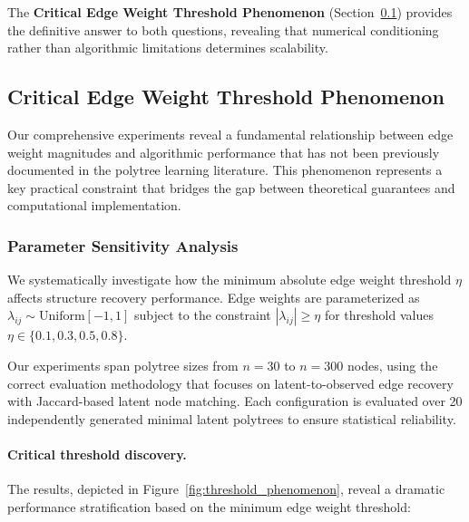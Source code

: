 \documentclass[11pt,a4paper]{article}
\numberwithin{equation}{section}
\begin{document}
The \textbf{Critical Edge Weight Threshold Phenomenon} (Section~\ref{subsec:threshold_phenomenon}) provides the definitive answer to both questions, revealing that numerical conditioning rather than algorithmic limitations determines scalability.


\subsection{Critical Edge Weight Threshold Phenomenon}
\label{subsec:threshold_phenomenon}

Our comprehensive experiments reveal a fundamental relationship between edge weight magnitudes and algorithmic performance that has not been previously documented in the polytree learning literature. This phenomenon represents a key practical constraint that bridges the gap between theoretical guarantees and computational implementation.

\subsubsection{Parameter Sensitivity Analysis}

We systematically investigate how the minimum absolute edge weight threshold $\eta$ affects structure recovery performance. Edge weights are parameterized as $\lambda_{ij} \sim \text{Uniform}[-1,1]$ subject to the constraint $|\lambda_{ij}| \geq \eta$ for threshold values $\eta \in \{0.1, 0.3, 0.5, 0.8\}$.

Our experiments span polytree sizes from $n = 30$ to $n = 300$ nodes, using the correct evaluation methodology that focuses on latent-to-observed edge recovery with Jaccard-based latent node matching. Each configuration is evaluated over 20 independently generated minimal latent polytrees to ensure statistical reliability.

\paragraph{Critical threshold discovery.} The results, depicted in Figure~\ref{fig:threshold_phenomenon}, reveal a dramatic performance stratification based on the minimum edge weight threshold:
\end{document}
